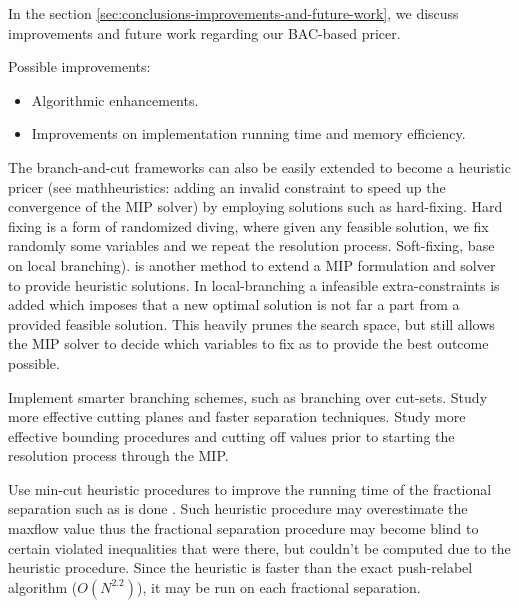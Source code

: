 In the section \cref{sec:conclusions-improvements-and-future-work},
we discuss improvements and future work regarding our BAC-based pricer.

Possible improvements:
\begin{itemize}
	\item Algorithmic enhancements.
	\item Improvements on implementation running time and memory efficiency.
\end{itemize}




The branch-and-cut frameworks can also be easily extended
to become a heuristic pricer
(see mathheuristics: adding an invalid constraint to speed up the convergence of the MIP solver)
by employing
solutions such as hard-fixing.
Hard fixing is a form of randomized diving,
where given any feasible solution,
we fix randomly some variables and we repeat the resolution
process.
Soft-fixing, base on local branching). is another method
to extend a MIP formulation and solver to provide
heuristic solutions.
In local-branching a infeasible extra-constraints is added
which imposes that a new optimal solution
is not far a part from a provided feasible solution.
This heavily prunes the search space, but still
allows the MIP solver to decide which variables
to fix as to provide the best outcome possible.

Implement smarter branching schemes, such as branching over cut-sets.
Study more effective cutting planes and
faster separation techniques.
Study more effective bounding procedures and cutting off values
prior to starting the resolution process through the MIP.

Use min-cut heuristic procedures to improve
the running time of the fractional separation
such as is done \textcite{kernighan1970}.
Such heuristic procedure may overestimate the maxflow
value thus the fractional separation procedure may
become blind to certain violated inequalities that were
there, but couldn't be computed due to the heuristic procedure.
Since the heuristic is faster than the exact push-relabel
algorithm ($O(N^{2.2})$), it may be run on each fractional
separation.

